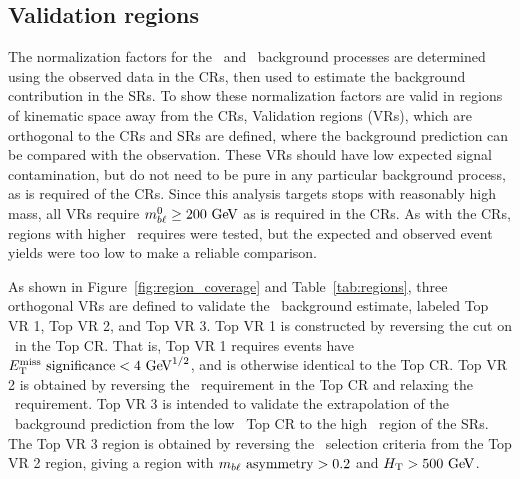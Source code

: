
\FloatBarrier
\subsection{Validation regions}
\label{sec:vr}

The normalization factors for the \TTBAR\ and \ZGAMMAJETS\ background processes
are determined using the observed data in the CRs, then used to estimate the
background contribution in the SRs.
To show these normalization factors are valid in regions of kinematic space away
from the CRs, Validation regions (VRs), which are orthogonal to the CRs and SRs
are defined, where the background prediction can be compared with the
observation.
These VRs should have low expected signal contamination, but do not need to be
pure in any particular background process, as is required of the CRs.
Since this analysis targets stops with reasonably high mass, all VRs require
$\MBL^0 \geq 200 \GeV$ as is required in the CRs.
As with the CRs, regions with higher \MBL\ requires were tested, but the
expected and observed event yields were too low to make a reliable comparison.

As shown in Figure~\ref{fig:region_coverage} and Table~\ref{tab:regions},
three orthogonal VRs are defined to validate the \TTBAR\ background estimate,
labeled Top VR 1, Top VR 2, and Top VR 3.
Top VR 1 is constructed by reversing the cut on \METSIG\ in the Top CR.
That is, Top VR 1 requires events have $\METSIG < 4 \GeV^{1/2}$, and is
otherwise identical to the Top CR.
Top VR 2 is obtained by reversing the \MBLASYM\ requirement in the Top CR and
relaxing the \METSIG\ requirement.
Top VR 3 is intended to validate the extrapolation of the \TTBAR\ background
prediction from the low \HT\ Top CR to the high \HT\ region of the SRs.
The Top VR 3 region is obtained by reversing the \HT\ selection criteria from
the Top VR 2 region, giving a region with $m_{b\ell}~\mathrm{asymmetry} > 0.2$ and $\HT > 500 \GeV$.

